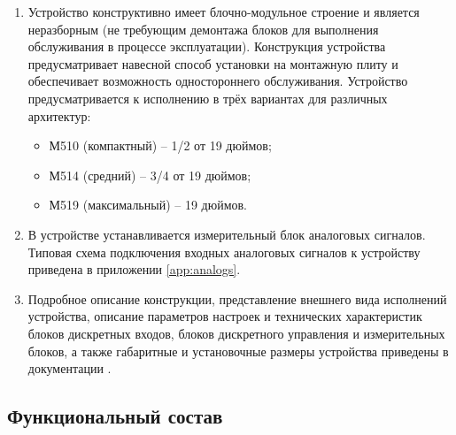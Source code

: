 \begin{enumerate}
\item Устройство конструктивно имеет блочно-модульное строение и является неразборным (не требующим демонтажа блоков для выполнения обслуживания в процессе эксплуатации).
Конструкция устройства предусматривает навесной способ установки на монтажную плиту и обеспечивает возможность одностороннего обслуживания.
Устройство предусматривается к исполнению в трёх вариантах для различных архитектур:
\begin{itemize}
\item М510 (компактный) – 1/2 от 19 дюймов;
\item М514 (средний) – 3/4 от 19 дюймов;
\item М519 (максимальный) – 19 дюймов.
\end{itemize}
\item В устройстве устанавливается измерительный блок аналоговых сигналов. Типовая схема подключения входных аналоговых сигналов к устройству приведена в приложении \ref{app:analogs}. \MeasuringBlock
\item Подробное описание конструкции, представление внешнего вида исполнений устройства, описание параметров настроек и технических характеристик блоков дискретных входов, блоков дискретного управления и измерительных блоков, а также габаритные и установочные размеры устройства приведены в документации \ManualUnitGeneral.
\end{enumerate}

{\color{unimain}\subsection{Функциональный состав}}

